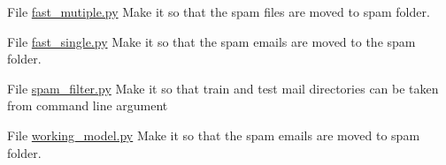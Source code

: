 
\begin{DoxyRefList}
\item[File \mbox{\hyperlink{fast__mutiple_8py}{fast\+\_\+mutiple.py}} ]\label{todo__todo000001}%
%
Make it so that the spam files are moved to spam folder.  
\item[File \mbox{\hyperlink{fast__single_8py}{fast\+\_\+single.py}} ]\label{todo__todo000002}%
%
Make it so that the spam emails are moved to the spam folder.  
\item[File \mbox{\hyperlink{spam__filter_8py}{spam\+\_\+filter.py}} ]\label{todo__todo000003}%
%
Make it so that train and test mail directories can be taken from command line argument  
\item[File \mbox{\hyperlink{working__model_8py}{working\+\_\+model.py}} ]\label{todo__todo000004}%
%
Make it so that the spam emails are moved to spam folder. 
\end{DoxyRefList}